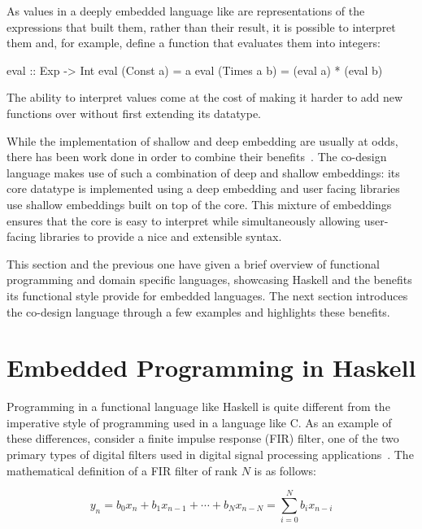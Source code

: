 \documentclass[../paper.tex]{subfiles}
\begin{document}
As values in a deeply embedded language like  are representations of the expressions that built them, rather than their result, it is possible to interpret them and, for example, define a function that evaluates them into integers:

\begin{code}
eval :: Exp -> Int
eval (Const a)   = a
eval (Times a b) = (eval a) * (eval b)
\end{code}

\noindent The ability to interpret values come at the cost of making it harder to add new functions over  without first extending its datatype.

While the implementation of shallow and deep embedding are usually at odds, there has been work done in order to combine their benefits~\cite{svenningsson2012}. The co-design language makes use of such a combination of deep and shallow embeddings: its core datatype is implemented using a deep embedding and user facing libraries use shallow embeddings built on top of the core. This mixture of embeddings ensures that the core is easy to interpret while simultaneously allowing user-facing libraries to provide a nice and extensible syntax.

This section and the previous one have given a brief overview of functional programming and domain specific languages, showcasing Haskell and the benefits its functional style provide for embedded languages. The next section introduces the co-design language through a few examples and highlights these benefits.

\section{Embedded Programming in Haskell}
\label{embedded}

Programming in a functional language like Haskell is quite different from the imperative style of programming used in a language like C. As an example of these differences, consider a finite impulse response (FIR) filter, one of the two primary types of digital filters used in digital signal processing applications~\cite{oppenheim1989}. The mathematical definition of a FIR filter of rank $N$ is as follows:

\begin{equation}
y_{n} = b_{0} x_{n} + b_{1} x_{n-1} + \cdots + b_{N} x_{n-N} = \sum_{i=0}^{N} b_{i} x_{n-i}
\end{equation}
\vspace{1mm}
\end{document}
